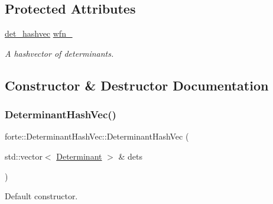 \subsection*{Protected Attributes}
\begin{DoxyCompactItemize}
\item 
\mbox{\hyperlink{namespaceforte_aee00ff2f656f0aa613d3f9f1ba01cad5}{det\+\_\+hashvec}} \mbox{\hyperlink{classforte_1_1_determinant_hash_vec_abbbb485c33b1f107c3cafef27cdf5215}{wfn\+\_\+}}
\begin{DoxyCompactList}\small\item\em A hashvector of determinants. \end{DoxyCompactList}\end{DoxyCompactItemize}


\subsection{Constructor \& Destructor Documentation}
\mbox{\label{classforte_1_1_determinant_hash_vec_aa09d2d81e23e9a1cdfbc6b595bb46a14}} 
\subsubsection{\texorpdfstring{Determinant\+Hash\+Vec()}{DeterminantHashVec()}\hspace{0.1cm}{\footnotesize\ttfamily [1/6]}}
{\footnotesize\ttfamily forte\+::\+Determinant\+Hash\+Vec\+::\+Determinant\+Hash\+Vec (\begin{DoxyParamCaption}\item[{std\+::vector$<$ \mbox{\hyperlink{namespaceforte_a2076c63fd7b8732004d9e1442ce527c1}{Determinant}} $>$ \&}]{dets }\end{DoxyParamCaption})}



Default constructor. 

\mbox{\label{classforte_1_1_determinant_hash_vec_a70682499ebdecf59a21a65536bef6419}} 
